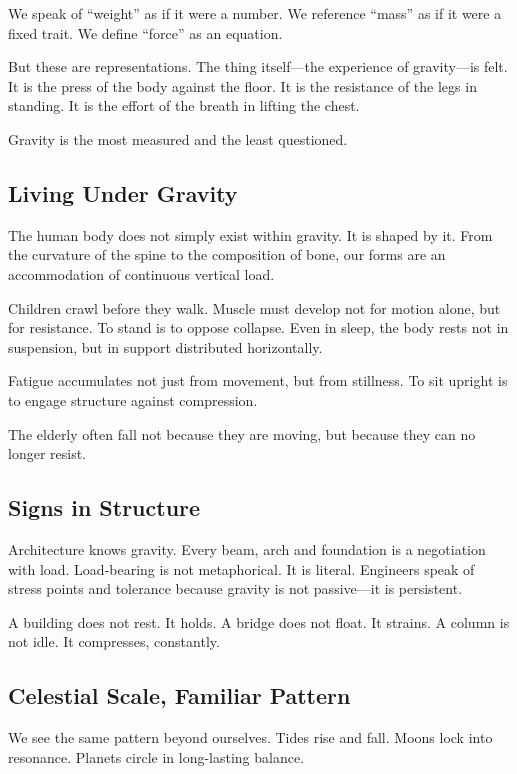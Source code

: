 \documentclass[11pt,a4paper]{article}
\begin{document}
We speak of ``weight'' as if it were a number. We reference ``mass'' as if it were a fixed trait. We define ``force'' as an equation.

But these are representations. The thing itself---the experience of gravity---is felt. It is the press of the body against the floor. It is the resistance of the legs in standing. It is the effort of the breath in lifting the chest.

Gravity is the most measured and the least questioned.

\subsection*{Living Under Gravity}

The human body does not simply exist within gravity. It is shaped by it. From the curvature of the spine to the composition of bone, our forms are an accommodation of continuous vertical load.

Children crawl before they walk. Muscle must develop not for motion alone, but for resistance. To stand is to oppose collapse. Even in sleep, the body rests not in suspension, but in support distributed horizontally.

Fatigue accumulates not just from movement, but from stillness. To sit upright is to engage structure against compression.

The elderly often fall not because they are moving, but because they can no longer resist.

\subsection*{Signs in Structure}

Architecture knows gravity. Every beam, arch and foundation is a negotiation with load. Load-bearing is not metaphorical. It is literal. Engineers speak of stress points and tolerance because gravity is not passive---it is persistent.

A building does not rest. It holds. A bridge does not float. It strains. A column is not idle. It compresses, constantly.

\subsection*{Celestial Scale, Familiar Pattern}

We see the same pattern beyond ourselves. Tides rise and fall. Moons lock into resonance. Planets circle in long-lasting balance.
\end{document}
